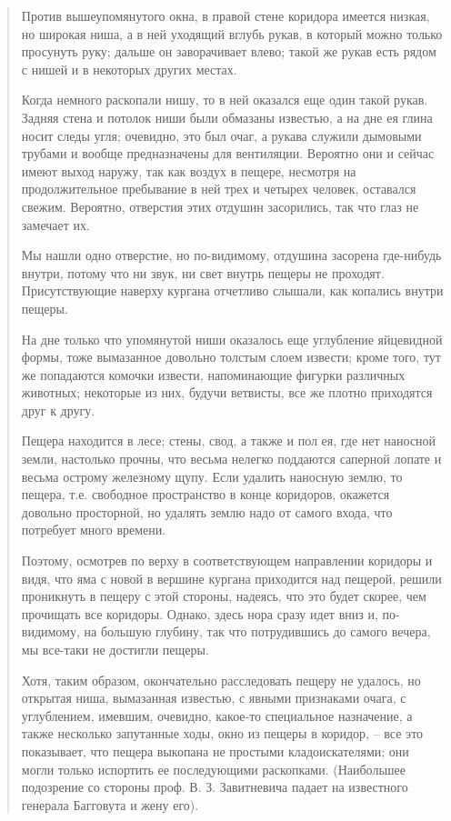\begin{quotation}
Против вышеупомянутого окна, в правой стене коридора имеется низкая, но широкая ниша, а в ней уходящий вглубь рукав, в который можно только просунуть руку; дальше он заворачивает влево; такой же рукав есть рядом с нишей и в некоторых других местах.

Когда немного раскопали нишу, то в ней оказался еще один такой рукав. Задняя стена и потолок ниши были обмазаны известью, а на дне ея глина носит следы угля; очевидно, это был очаг, а рукава служили дымовыми трубами и вообще предназначены для вентиляции. Вероятно они и сейчас имеют выход наружу, так как воздух в пещере, несмотря на продолжительное пребывание в ней трех и четырех человек, оставался свежим. Вероятно, отверстия этих отдушин засорились, так что глаз не замечает их.

Мы нашли одно отверстие, но по-видимому, отдушина засорена где-нибудь внутри, потому что ни звук, ни свет внутрь пещеры не проходят. Присутствующие наверху кургана отчетливо слышали, как копались внутри пещеры. 

На дне только что упомянутой ниши оказалось еще углубление яйцевидной формы, тоже вымазанное довольно толстым слоем извести; кроме того, тут же попадаются комочки извести, напоминающие фигурки различных животных; некоторые из них, будучи ветвисты, все же плотно приходятся друг к другу.

Пещера находится в лесе; стены, свод, а также и пол ея, где нет наносной земли, настолько прочны, что весьма нелегко поддаются саперной лопате и весьма острому железному щупу. Если удалить наносную землю, то пещера, т.е. свободное пространство в конце коридоров, окажется довольно просторной, но удалять землю надо от самого входа, что потребует много времени.

Поэтому, осмотрев по верху в соответствующем направлении коридоры и видя, что яма с новой в вершине кургана приходится над пещерой, решили проникнуть в пещеру с этой стороны, надеясь, что это будет скорее, чем прочищать все коридоры. Однако, здесь нора сразу идет вниз и, по-видимому, на большую глубину, так что потрудившись до самого вечера, мы все-таки не достигли пещеры. 

Хотя, таким образом, окончательно расследовать пещеру не удалось, но открытая ниша, вымазанная известью, с явными признаками очага, с углублением, имевшим, очевидно, какое-то специальное назначение, а также несколько запутанные ходы, окно из пещеры в коридор, – все это показывает, что пещера выкопана не простыми кладоискателями; они могли только испортить ее последующими раскопками. (Наибольшее подозрение со стороны проф. В. З. Завитневича падает на известного генерала Багговута и жену его).


\end{quotation}
